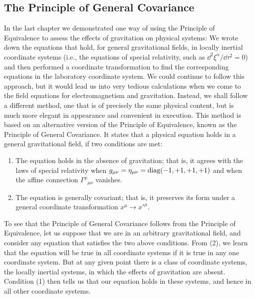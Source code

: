 
\subsection{The Principle of General Covariance}\label{sec:4.1}

In the last chapter we demonstrated one way of using the Principle of
Equivalence to assess the effects of gravitation on physical systems: We wrote
down the equations that hold, for general gravitational fields, in locally
inertial coordinate systems (i.e., the equations of special relativity, such as
\(\dd^2\xi^\alpha/\dd\tau^2=0\)) and then performed a coordinate
transformation to find the corresponding equations in the laboratory
coordinate system. We could continue to follow this approach, but it would
lead us into very tedious calculations when we come to the field equations for
electromagnetism and gravitation. Instead, we shall follow a different method,
one that is of precisely the same physical content, but is much more elegant in
appearance and convenient in execution. This method is based on an alternative
version of the Principle of Equivalence, known as the Principle of General
Covariance. It states that a physical equation holds in a general
gravitational field, if two conditions are met:

\begin{enumerate}
  \item The equation holds in the absence of gravitation; that is, it agrees
  with the laws of special relativity when
  \(g_{\mu\nu}=\eta_{\mu\nu}=\operatorname{diag}(-1,+1,+1,+1)\) and when the affine
  connection \(\Gamma^\rho{}_{\mu\nu}\) vanishes.

  \item The equation is generally covariant; that is, it preserves its form
  under a general coordinate transformation \(x^\mu\to x'^\mu\).
\end{enumerate}

To see that the Principle of General Covariance follows from the Principle of
Equivalence, let us suppose that we are in an arbitrary gravitational field,
and consider any equation that satisfies the two above conditions. From (2),
we learn that the equation will be true in all coordinate systems if it is
true in any one coordinate system. But at any given point there is a class of
coordinate systems, the locally inertial systems, in which the effects of
gravitation are absent. Condition (1) then tells us that our equation holds in
these systems, and hence in all other coordinate systems.


